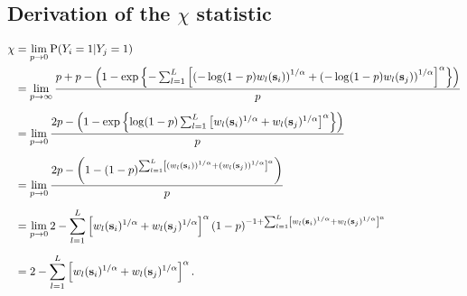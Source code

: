 \subsection{Derivation of the $\chi$ statistic}\label{a:chi}
\begin{align} \label{chi}
  \chi &= \lim_{p \rightarrow 0 }\text{P}(Y_i = 1|Y_j = 1)\nonumber \\
   &= \lim_{p \rightarrow \infty }\frac{ p + p - \left( 1 - \exp \left \{ - \sum_{ l = 1 }^{ L } \left[ \left( -\log(1-p) w_{l}(\mathbf{s}_i) \right)^{ 1/\alpha } + \left( -\log(1 - p) w_{ l}(\mathbf{s}_j) \right)^{ 1/\alpha } \right]^{\alpha} \right \} \right) }{ p } \nonumber \\[0.5em]
  &= \lim_{p \rightarrow 0 } \frac{ 2p - \left( 1 - \exp \left \{ \log(1-p) \sum_{ l = 1 }^{ L } \left[  w_{l}(\mathbf{s}_i) ^{ 1/\alpha } +  w_{ l}(\mathbf{s}_j) ^{ 1/\alpha } \right]^{\alpha} \right \} \right) }{ p } \nonumber \\[0.5em]
  &= \lim_{p \rightarrow 0 } \frac{ 2p - \left( 1 - (1-p)^{ \sum_{ l = 1 }^{ L } \left[ \left( w_{l}(\mathbf{s}_i) \right)^{ 1/\alpha } + \left( w_{ l}(\mathbf{s}_j) \right)^{ 1/\alpha } \right]^\alpha } \right) }{ p } \nonumber \\[0.5em]
  &=\lim_{p \rightarrow 0 } 2 -\sum_{ l = 1 }^{ L } \left[ w_{l}(\mathbf{s}_i) ^{ 1/\alpha } +  w_{ l} (\mathbf{s}_j)^{ 1/\alpha } \right]^\alpha ( 1 - p)^{ -1 + \sum_{ l = 1 }^{ L } \left[  w_{l}(\mathbf{s}_i) ^{ 1/\alpha } +  w_{ l}(\mathbf{s}_j)^{ 1/\alpha } \right]^\alpha } \nonumber \\[0.5em]
  &= 2 -  \sum_{ l = 1 }^{ L } \left[ w_{l}(\mathbf{s}_i)^{ 1/\alpha } +  w_{ l}(\mathbf{s}_j) ^{ 1/\alpha } \right]^\alpha.
\end{align}